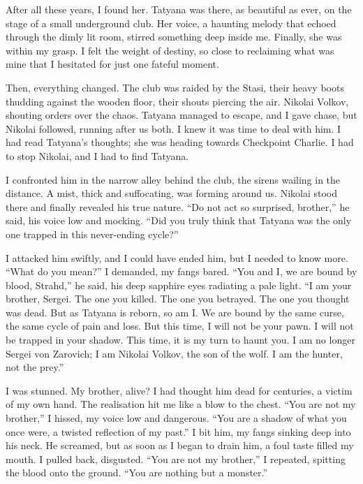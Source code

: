 
After all these years, I found her.
Tatyana was there, as beautiful as ever, on the stage of a small underground club.
Her voice, a haunting melody that echoed through the dimly lit room, stirred something deep inside me.
Finally, she was within my grasp.
I felt the weight of destiny, so close to reclaiming what was mine that I hesitated for just one fateful moment.

Then, everything changed.
The club was raided by the Stasi, their heavy boots thudding against the wooden floor, their shouts piercing the air.
Nikolai Volkov, shouting orders over the chaos.
Tatyana managed to escape, and I gave chase, but Nikolai followed, running after us both.
I knew it was time to deal with him.
I had read Tatyana's thoughts; she was heading towards Checkpoint Charlie.
I had to stop Nikolai, and I had to find Tatyana.

I confronted him in the narrow alley behind the club, the sirens wailing in the distance.
A mist, thick and suffocating, was forming around us.
Nikolai stood there and finally revealed his true nature.
``Do not act so surprised, brother,'' he said, his voice low and mocking.
``Did you truly think that Tatyana was the only one trapped in this never-ending cycle?''

I attacked him swiftly, and I could have ended him, but I needed to know more.
``What do you mean?'' I demanded, my fangs bared.
``You and I, we are bound by blood, Strahd,'' he said, his deep sapphire eyes radiating a pale light.
``I am your brother, Sergei.
The one you killed.
The one you betrayed.
The one you thought was dead.
But as Tatyana is reborn, so am I.
We are bound by the same curse, the same cycle of pain and loss.
But this time, I will not be your pawn.
I will not be trapped in your shadow.
This time, it is my turn to haunt you.
I am no longer Sergei von Zarovich; I am Nikolai Volkov, the son of the wolf.
I am the hunter, not the prey.''

I was stunned.
My brother, alive? I had thought him dead for centuries, a victim of my own hand.
The realisation hit me like a blow to the chest.
``You are not my brother,'' I hissed, my voice low and dangerous.
``You are a shadow of what you once were, a twisted reflection of my past.''
I bit him, my fangs sinking deep into his neck.
He screamed, but as soon as I began to drain him, a foul taste filled my mouth.
I pulled back, disgusted.
``You are not my brother,'' I repeated, spitting the blood onto the ground.
``You are nothing but a monster.''

